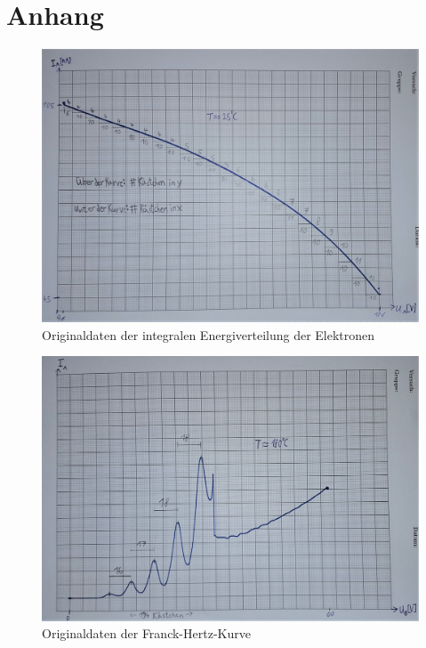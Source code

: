 \section{Anhang}
\label{sec:Anhang}

\begin{landscape}
    \thispagestyle{empty}
    \begin{figure}[htb]
        \centering
        \includegraphics[width=1.3\textwidth]{images/originaldaten_1.jpg}        
        \caption{Originaldaten der integralen Energiverteilung der Elektronen}
        \label{fig:originaldaten_elektronen}
    \end{figure}
\end{landscape}

\begin{landscape}
    \begin{figure}
        \centering
        \includegraphics[width=1.3\textwidth]{images/originaldaten_2.jpg}        
        \caption{Originaldaten der Franck-Hertz-Kurve}
        \label{fig:originaldaten_franck-hertz}
    \end{figure}
\end{landscape}